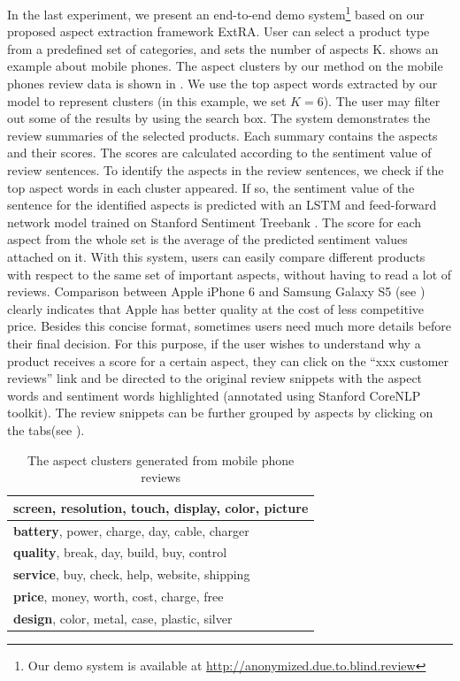 In the last experiment, we present an end-to-end demo system\footnote{Our demo system is available at \url{http://anonymized.due.to.blind.review}} based on our proposed aspect extraction framework ExtRA. User can select a product type from a predefined set of categories, and sets the
number of aspects K.  shows an example about mobile phones. The aspect clusters by our method on the mobile phones review data is shown in .  We use the top aspect words extracted by our model to represent clusters (in this example, we set $K=6$). The user may filter out some of the results by using the search box. The system demonstrates the review summaries of the selected products. Each summary contains the aspects and their scores. The scores are calculated according to the sentiment value of review sentences. To identify the aspects in the review sentences, we check if the top aspect words in each cluster appeared. 
If so, the sentiment value of the sentence for the identified aspects is predicted with an LSTM and feed-forward network model trained on Stanford Sentiment Treebank \cite{socher2013recursive}. The score for each aspect from the whole set is the average of the predicted sentiment values attached on it. With this system, users can easily compare different products with respect to the same set of important aspects, without having to read a lot of reviews. Comparison between Apple iPhone 6 and Samsung Galaxy S5 (see ) clearly indicates that Apple has better quality at the cost of less competitive price. Besides this concise format, sometimes users need much more details before their final decision. For this purpose, if the user wishes to understand why a product receives a score for a certain aspect, they can click on the ``xxx customer reviews'' link and be directed to the original review snippets with the aspect words and sentiment words highlighted (annotated using Stanford CoreNLP toolkit\cite{manning-EtAl:2014:P14-5}). The review snippets can be further grouped by aspects by clicking on the tabs(see ).

 
\begin{table}[th]
	\centering
	\caption{The aspect clusters generated from mobile phone reviews}
	\label{table:clusters}
	\begin{tabular}{|l|}
		\hline
		\textbf{screen}, resolution, touch, display, color, picture \\ \hline
		\textbf{battery}, power, charge, day, cable, charger \\ \hline
		\textbf{quality}, break, day, build, buy, control \\ \hline
		\textbf{service}, buy, check, help, website, shipping \\ \hline
		\textbf{price}, money, worth, cost, charge, free \\ \hline
		\textbf{design}, color, metal, case, plastic, silver \\ \hline
	\end{tabular}
\end{table}


